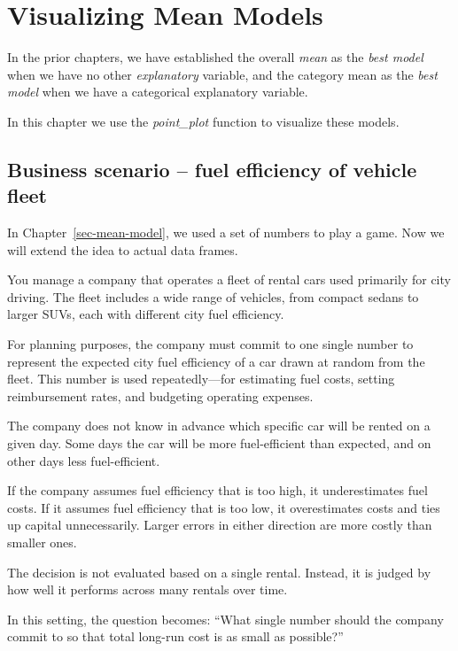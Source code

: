\documentclass[
  12pt,
  letterpaper,
  DIV=11,
  numbers=noendperiod]{scrreprt}
\begin{document}
\chapter{Visualizing Mean Models}\label{sec-visualizing-mean-models}

In the prior chapters, we have established the overall \emph{mean} as
the \emph{best model} when we have no other \emph{explanatory} variable,
and the category mean as the \emph{best model} when we have a
categorical explanatory variable.

In this chapter we use the \emph{point\_plot} function to visualize
these models.

\section{Business scenario -- fuel efficiency of vehicle
fleet}\label{business-scenario-fuel-efficiency-of-vehicle-fleet}

In Chapter~\ref{sec-mean-model}, we used a set of numbers to play a
game. Now we will extend the idea to actual data frames.

You manage a company that operates a fleet of rental cars used primarily
for city driving. The fleet includes a wide range of vehicles, from
compact sedans to larger SUVs, each with different city fuel efficiency.

For planning purposes, the company must commit to one single number to
represent the expected city fuel efficiency of a car drawn at random
from the fleet. This number is used repeatedly---for estimating fuel
costs, setting reimbursement rates, and budgeting operating expenses.

The company does not know in advance which specific car will be rented
on a given day. Some days the car will be more fuel-efficient than
expected, and on other days less fuel-efficient.

If the company assumes fuel efficiency that is too high, it
underestimates fuel costs. If it assumes fuel efficiency that is too
low, it overestimates costs and ties up capital unnecessarily. Larger
errors in either direction are more costly than smaller ones.

The decision is not evaluated based on a single rental. Instead, it is
judged by how well it performs across many rentals over time.

In this setting, the question becomes: ``What single number should the
company commit to so that total long-run cost is as small as possible?''
\end{document}
